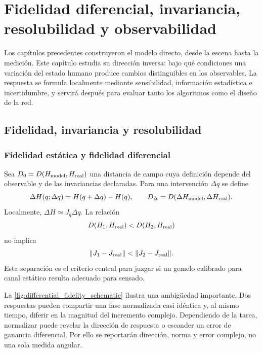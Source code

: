 \chapter{Fidelidad diferencial, invariancia, resolubilidad y observabilidad}
\label{ch:fidelity_observability}
\label{ch:observability}

Los capítulos precedentes construyeron el modelo directo, desde la escena hasta la
medición. Este capítulo estudia su dirección inversa: bajo qué condiciones una variación
del estado humano produce cambios distinguibles en los observables. La respuesta se
formula localmente mediante sensibilidad, información estadística e incertidumbre, y
servirá después para evaluar tanto los algoritmos como el diseño de la red.

\section{Fidelidad, invariancia y resolubilidad}

\subsection{Fidelidad estática y fidelidad diferencial}

Sea $D_0=D(H_{\rm model},H_{\rm real})$ una distancia de campo cuya definición
depende del observable y de las invariancias declaradas. Para una intervención
$\Delta q$ se define
\begin{equation}
\Delta H(q;\Delta q)=H(q+\Delta q)-H(q),\qquad
D_\Delta=D(\Delta H_{\rm model},\Delta H_{\rm real}).
\end{equation}
Localmente, $\Delta H\simeq J_q\Delta q$. La relación
\begin{equation}
D(H_1,H_{\rm real})<D(H_2,H_{\rm real})
\end{equation}
no implica
\begin{equation}
\|J_1-J_{\rm real}\|<\|J_2-J_{\rm real}\|.
\label{eq:static_not_differential}
\end{equation}
Esta separación es el criterio central para juzgar si un gemelo calibrado para canal
estático resulta adecuado para sensado.

La \cref{fig:differential_fidelity_schematic} ilustra una ambigüedad importante.
Dos respuestas pueden compartir una fase normalizada casi idéntica y, al mismo
tiempo, diferir en la magnitud del incremento complejo. Dependiendo de la tarea,
normalizar puede revelar la dirección de respuesta o esconder un error de ganancia
diferencial. Por ello se reportarán dirección, norma y error complejo, no una sola
medida angular.

